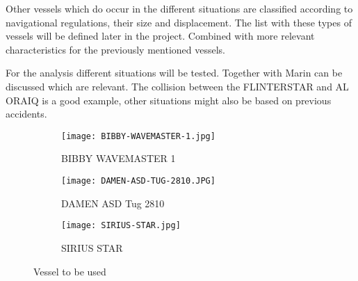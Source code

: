 Other vessels which do occur in the different situations are classified according to navigational regulations, their size and displacement. The list with these types of vessels will be defined later in the project. Combined with more relevant characteristics for the previously mentioned vessels.

For the analysis different situations will be tested. Together with Marin can be discussed which are relevant. The collision between the FLINTERSTAR and AL ORAIQ is a good example, other situations might also be based on previous accidents.

\begin{figure}[H]
	\centering
	
	\begin{subfigure}[b]{0.3\textwidth}
		\texttt{[image: BIBBY-WAVEMASTER-1.jpg]}
		\caption{BIBBY WAVEMASTER 1}
	\end{subfigure}
	\hfill
	\begin{subfigure}[b]{0.3\textwidth}
		\texttt{[image: DAMEN-ASD-TUG-2810.JPG]}
		\caption{DAMEN ASD Tug 2810}
	\end{subfigure}
	\hfill
	\begin{subfigure}[b]{0.3\textwidth}
		\texttt{[image: SIRIUS-STAR.jpg]}
		\caption{SIRIUS STAR}
	\end{subfigure}	
	
	\caption{Vessel to be used}
	\label{fig:vessels}
	
\end{figure}